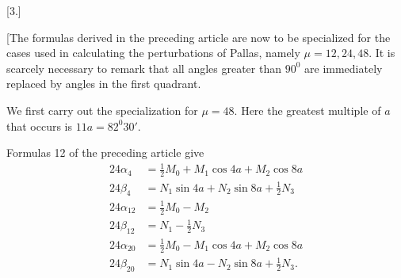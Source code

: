 \clearpage
\begin{landscape}
\begingroup
\fontsize{9.5}{12}\selectfont
{}
\renewcommand{\headrulewidth}{0pt}
\makeatletter\tagsleft@true\let\veqno\@@leqno\makeatother
\setlength{\lineskip}{4pt}\setlength{\lineskiplimit}{4pt}
\newcommand{\VthreeTerminalPair}{\mathord{\text{\makebox[.14em][l]{\raisebox{.75ex}{\rule{.055em}{.16ex}}\kern-.055em\raisebox{-.18ex}{,}}}}}
\newcommand{\VthreeRaisedPoint}{\mathord{\text{\raisebox{.5ex}{.}}}}
\newcommand{\VthreeLowDash}{\mathord{\text{\makebox[0pt][l]{\kern-.06em\raisebox{-.32ex}{\rule{.15em}{.045ex}}}}}}
\newcommand{\VthreeBrokenMark}{\mathord{\text{\makebox[.1em][l]{\raisebox{.8ex}{\rule{.055em}{.22ex}}\kern-.055em\raisebox{-.1ex}{\rule{.08em}{.5ex}}}}}}
\newcommand{\VthreeLowMark}{\mathord{\text{\makebox[0pt][l]{\kern-.1em\raisebox{-.65ex}{,}}}}}
\newcommand{\VthreeVerticalMark}{\mathord{\text{\makebox[.1em][l]{\raisebox{-.1ex}{\rule{.08em}{1.1ex}}}}}}
\begin{center}[3.]\end{center}
\par\noindent\hspace*{\parindent}[The formulas derived in the preceding article are now to be specialized for the cases used in calculating the perturbations of Pallas, namely \(\mu=12,24,48\). It is scarcely necessary to remark that all angles greater than \(90^0\) are immediately replaced by angles in the first quadrant.
\par\noindent\hspace*{\parindent}We first carry out the specialization for \(\mu=48\). Here the greatest multiple of \(a\) that occurs is \(11a=82^0 30'\).
\par\noindent\hspace*{\parindent}Formulas 12 of the preceding article give
\[
\tag*{1)}
\begin{aligned}
24\alpha_4&=\tfrac12 M_0+M_1\cos4a+M_2\cos8a\\
24\beta_4&=N_1\sin4a+N_2\sin8a+\tfrac12 N_3\\[4pt]
24\alpha_{12}&=\tfrac12 M_0-M_2\\
24\beta_{12}&=N_1-\tfrac12 N_3\\[4pt]
24\alpha_{20}&=\tfrac12 M_0-M_1\cos4a+M_2\cos8a\\
24\beta_{20}&=N_1\sin4a-N_2\sin8a+\tfrac12 N_3.
\end{aligned}
\]
\end{landscape}
